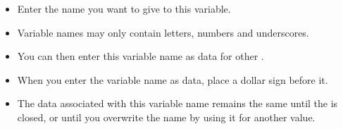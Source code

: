 \begin{itemize}
\item Enter the name you want to give to this variable. 
\item Variable names may only contain letters, numbers and underscores. 
\item You can then enter this variable name as data for other \gdsteps{}. 
\item When you enter the variable name as data, place a dollar sign before it. 
\item The data associated with this variable name remains the same until the \gdproject{} is closed, or until you overwrite the name by using it for another value. 
\end{itemize}
